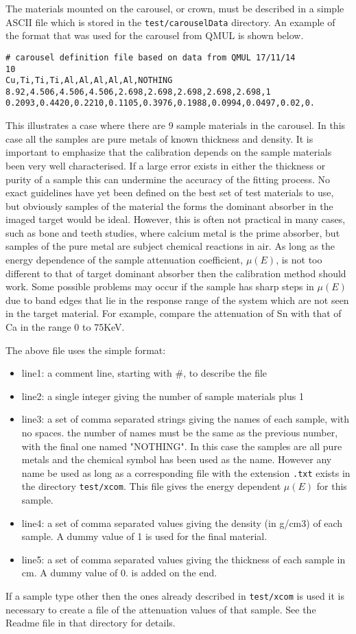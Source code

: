 \documentclass[a4paper,12pt]{article}
\begin{document}
The materials mounted on the carousel, or crown, must be described in a simple ASCII file which is stored
in the \texttt{test/carouselData} directory.
An example of the format that was used for the carousel from QMUL is shown below.
\begin{verbatim}
# carousel definition file based on data from QMUL 17/11/14
10
Cu,Ti,Ti,Ti,Al,Al,Al,Al,Al,NOTHING
8.92,4.506,4.506,4.506,2.698,2.698,2.698,2.698,2.698,1
0.2093,0.4420,0.2210,0.1105,0.3976,0.1988,0.0994,0.0497,0.02,0.
\end{verbatim}

This illustrates a case where there are 9 sample materials in the carousel.
In this case all the samples are pure metals of known thickness and density.
It is important to emphasize that the calibration depends on the sample materials
been very well characterised.
If a large error exists in either the thickness or purity of a sample this can undermine
the accuracy of the fitting process.
No exact guidelines have yet been defined on the best set of test materials to use, but obviously
samples of the material the forms the dominant absorber in the imaged target would be ideal.
However, this is often not practical in many cases, such as bone and teeth studies, where calcium metal
is the prime absorber, but samples of the pure metal are subject chemical reactions in air.
As long as the energy dependence of the sample attenuation coefficient, $\mu(E)$, is not too different to that of
target dominant absorber then the calibration method should work.
Some possible problems may occur if the sample has sharp steps in $\mu(E)$ due to band edges that lie in the
response range of the system which are not seen in the target material.
For example, compare the attenuation of Sn with that of Ca in the range 0 to 75KeV.

The above file uses the simple format:
\begin{itemize}
\item{line1:} a comment line, starting with \#, to describe the file
\item{line2:} a single integer giving the number of sample materials plus 1
\item{line3:} a set of comma separated strings giving the names of each sample, with no spaces. the
number of names must be the same as the previous number, with the final one named "NOTHING".
In this case the samples are all pure metals and the chemical symbol has been used as the name.
However any name be used as long as a corresponding file with the extension \texttt{.txt} exists
in the directory \texttt{test/xcom}. This file gives the energy dependent $\mu(E)$ for this sample.
\item{line4:} a set of comma separated values giving the density (in g/cm3) of each sample. A dummy
value of 1 is used for the final material.
\item{line5:} a set of comma separated values giving the thickness of each sample in cm. A dummy value of
0. is added on the end.
\end{itemize}
If a sample type other then the ones already described in \texttt{test/xcom} is used it is necessary to
create a file of the attenuation values of that sample.
See the Readme file in that directory for details.
\end{document}
